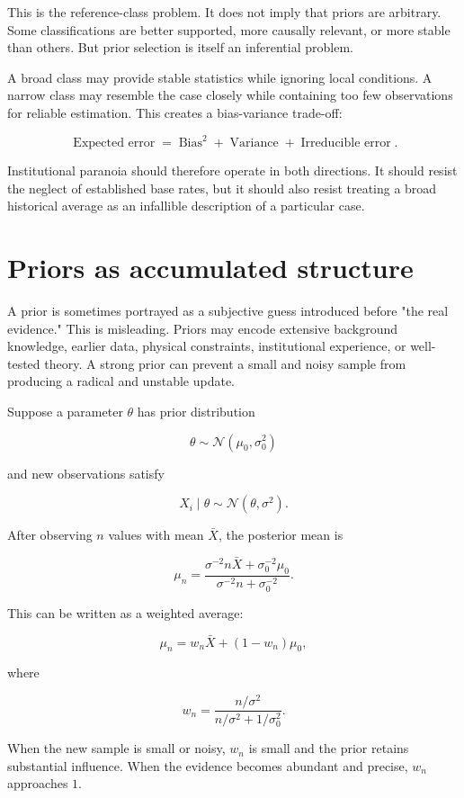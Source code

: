 This is the reference-class problem. It does not imply that priors are arbitrary. Some classifications are better supported, more causally relevant, or more stable than others. But prior selection is itself an inferential problem.

A broad class may provide stable statistics while ignoring local conditions. A narrow class may resemble the case closely while containing too few observations for reliable estimation. This creates a bias-variance trade-off:

\[
\operatorname{Expected\ error}
=
\operatorname{Bias}^2
+
\operatorname{Variance}
+
\operatorname{Irreducible\ error}.
\]

Institutional paranoia should therefore operate in both directions. It should resist the neglect of established base rates, but it should also resist treating a broad historical average as an infallible description of a particular case.

\section{Priors as accumulated structure}
\label{sec:a12}

A prior is sometimes portrayed as a subjective guess introduced before "the real evidence." This is misleading. Priors may encode extensive background knowledge, earlier data, physical constraints, institutional experience, or well-tested theory. A strong prior can prevent a small and noisy sample from producing a radical and unstable update.

Suppose a parameter \(\theta\) has prior distribution

\[
\theta\sim\mathcal N(\mu_0,\sigma_0^2)
\]

and new observations satisfy

\[
X_i\mid\theta
\sim
\mathcal N(\theta,\sigma^2).
\]

After observing \(n\) values with mean \(\bar X\), the posterior mean is

\[
\mu_n
=
\frac{\sigma^{-2}n\bar X+\sigma_0^{-2}\mu_0}
{\sigma^{-2}n+\sigma_0^{-2}}.
\]

This can be written as a weighted average:

\[
\mu_n
=
w_n\bar X+(1-w_n)\mu_0,
\]

where

\[
w_n
=
\frac{n/\sigma^2}
{n/\sigma^2+1/\sigma_0^2}.
\]

When the new sample is small or noisy, \(w_n\) is small and the prior retains substantial influence. When the evidence becomes abundant and precise, \(w_n\) approaches \(1\).

